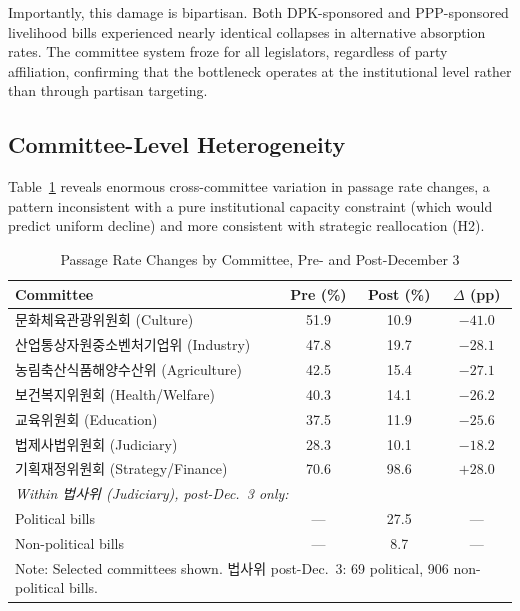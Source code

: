 \documentclass[11pt]{article}
\begin{document}
Importantly, this damage is bipartisan. Both DPK-sponsored and PPP-sponsored livelihood bills experienced nearly identical collapses in alternative absorption rates. The committee system froze for all legislators, regardless of party affiliation, confirming that the bottleneck operates at the institutional level rather than through partisan targeting.

\subsection{Committee-Level Heterogeneity}

Table~\ref{tab:committee} reveals enormous cross-committee variation in passage rate changes, a pattern inconsistent with a pure institutional capacity constraint (which would predict uniform decline) and more consistent with strategic reallocation (H2).

\begin{table}[htbp]
\centering
\caption{Passage Rate Changes by Committee, Pre- and Post-December 3}
\label{tab:committee}
\begin{tabular}{lccc}
\toprule
Committee & Pre (\%) & Post (\%) & $\Delta$ (pp) \\
\midrule
문화체육관광위원회 (Culture) & 51.9 & 10.9 & $-41.0$ \\
산업통상자원중소벤처기업위 (Industry) & 47.8 & 19.7 & $-28.1$ \\
농림축산식품해양수산위 (Agriculture) & 42.5 & 15.4 & $-27.1$ \\
보건복지위원회 (Health/Welfare) & 40.3 & 14.1 & $-26.2$ \\
교육위원회 (Education) & 37.5 & 11.9 & $-25.6$ \\
법제사법위원회 (Judiciary) & 28.3 & 10.1 & $-18.2$ \\
기획재정위원회 (Strategy/Finance) & 70.6 & 98.6 & $+28.0$ \\
\midrule
\multicolumn{4}{l}{\textit{Within 법사위 (Judiciary), post-Dec.\ 3 only:}} \\
\quad Political bills & --- & 27.5 & --- \\
\quad Non-political bills & --- & 8.7 & --- \\
\bottomrule
\multicolumn{4}{l}{\footnotesize Note: Selected committees shown. 법사위 post-Dec.\ 3: 69 political, 906 non-political bills.}
\end{tabular}
\end{table}
\end{document}
